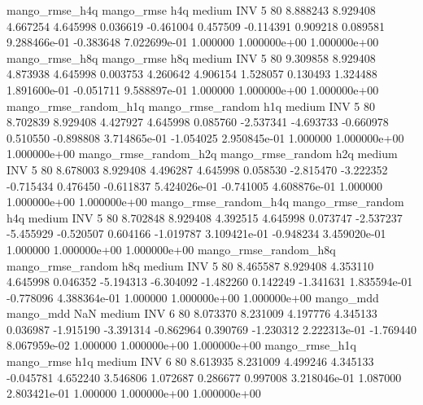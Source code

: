        mango_rmse_h4q        mango_rmse                  h4q     medium      INV                 5 80  8.888243       8.929408 4.667254       4.645998    0.036619     -0.461004      0.457509    -0.114391       0.909218  0.089581 9.288466e-01    -0.383648   7.022699e-01            1.000000    1.000000e+00        1.000000e+00
       mango_rmse_h8q        mango_rmse                  h8q     medium      INV                 5 80  9.309858       8.929408 4.873938       4.645998    0.003753      4.260642      4.906154     1.528057       0.130493  1.324488 1.891600e-01    -0.051711   9.588897e-01            1.000000    1.000000e+00        1.000000e+00
mango_rmse_random_h1q mango_rmse_random                  h1q     medium      INV                 5 80  8.702839       8.929408 4.427927       4.645998    0.085760     -2.537341     -4.693733    -0.660978       0.510550 -0.898808 3.714865e-01    -1.054025   2.950845e-01            1.000000    1.000000e+00        1.000000e+00
mango_rmse_random_h2q mango_rmse_random                  h2q     medium      INV                 5 80  8.678003       8.929408 4.496287       4.645998    0.058530     -2.815470     -3.222352    -0.715434       0.476450 -0.611837 5.424026e-01    -0.741005   4.608876e-01            1.000000    1.000000e+00        1.000000e+00
mango_rmse_random_h4q mango_rmse_random                  h4q     medium      INV                 5 80  8.702848       8.929408 4.392515       4.645998    0.073747     -2.537237     -5.455929    -0.520507       0.604166 -1.019787 3.109421e-01    -0.948234   3.459020e-01            1.000000    1.000000e+00        1.000000e+00
mango_rmse_random_h8q mango_rmse_random                  h8q     medium      INV                 5 80  8.465587       8.929408 4.353110       4.645998    0.046352     -5.194313     -6.304092    -1.482260       0.142249 -1.341631 1.835594e-01    -0.778096   4.388364e-01            1.000000    1.000000e+00        1.000000e+00
            mango_mdd         mango_mdd                  NaN     medium      INV                 6 80  8.073370       8.231009 4.197776       4.345133    0.036987     -1.915190     -3.391314    -0.862964       0.390769 -1.230312 2.222313e-01    -1.769440   8.067959e-02            1.000000    1.000000e+00        1.000000e+00
       mango_rmse_h1q        mango_rmse                  h1q     medium      INV                 6 80  8.613935       8.231009 4.499246       4.345133   -0.045781      4.652240      3.546806     1.072687       0.286677  0.997008 3.218046e-01     1.087000   2.803421e-01            1.000000    1.000000e+00        1.000000e+00
